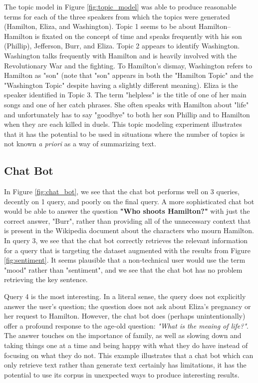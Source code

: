 \documentclass{article}
\begin{document}
The topic model in Figure \ref{fig:topic_model} was able to produce reasonable terms for each of the three speakers from which the topics were generated (Hamilton, Eliza, and Washington). Topic 1 seems to be about Hamilton--Hamilton is fixated on the concept of time and speaks frequently with his son (Phillip), Jefferson, Burr, and Eliza. Topic 2 appears to identify Washington. Washington talks frequently with Hamilton and is heavily involved with the Revolutionary War and the fighting. To Hamilton's dismay, Washington refers to Hamilton as "son" (note that "son" appears in both the "Hamilton Topic" and the "Washington Topic" despite having a slightly different meaning). Eliza is the speaker identified in Topic 3. The term "helpless" is the title of one of her main songs and one of her catch phrases. She often speaks with Hamilton about "life" and unfortunately has to say "goodbye" to both her son Phillip and to Hamilton when they are each killed in duels. This topic modeling experiment illustrates that it has the potential to be used in situations where the number of topics is not known \emph{a priori} as a way of summarizing text.

\subsection{Chat Bot}

In Figure \ref{fig:chat_bot}, we see that the chat bot performs well on 3 queries, decently on 1 query, and poorly on the final query. A more sophisticated chat bot would be able to answer the question \textbf{"Who shoots Hamilton?"} with just the correct answer, "Burr", rather than providing all of the unnecessary context that is present in the Wikipedia document about the characters who mourn Hamilton. In query 3, we see that the chat bot correctly retrieves the relevant information for a query that is targeting the dataset augmented with the results from Figure \ref{fig:sentiment}. It seems plausible that a non-technical user would use the term "mood" rather than "sentiment", and we see that the chat bot has no problem retrieving the key sentence. 

Query 4 is the most interesting. In a literal sense, the query does not explicitly answer the user's question; the question does not ask about Eliza's pregnancy or her request to Hamilton. However, the chat bot does (perhaps unintentionally) offer a profound response to the age-old question: \emph{"What is the meaing of life?"}. The answer touches on the importance of family, as well as slowing down and taking things one at a time and being happy with what they do have instead of focusing on what they do not. This example illustrates that a chat bot which can only retrieve text rather than generate text certainly has limitations, it has the potential to use its corpus in unexpected ways to produce interesting results.
\end{document}
